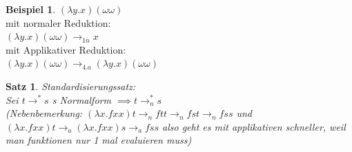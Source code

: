 \documentclass{article}
\newtheorem{satz}{Satz}
\theoremstyle{definition}
\newtheorem{beispiel}{Beispiel}[section]
\begin{document}
	\begin{beispiel} $(\lambda y.x)(\omega\omega)$\\
	mit normaler Reduktion:\\
	$(\lambda y.x)(\omega\omega)\to_{1n} x$\\
	mit Applikativer Reduktion:\\
	$(\lambda y.x)(\omega\omega)\to_{4.a} (\lambda y.x)(\omega\omega)$
	\end{beispiel}
	\begin{satz} Standardisierungssatz:\\
	Sei $t\to^* s$ s Normalform $\implies t\to_n^* s$\\
	(Nebenbemerkung: $(\lambda x.fxx)t\to_n ftt\to_n fst\to_nfss$ und $(\lambda x.fxx)t\to_a (\lambda x.fxx)s\to_a fss$ also geht es mit applikativen schneller, weil man funktionen nur 1 mal evaluieren muss)
	\end{satz}
\end{document}
